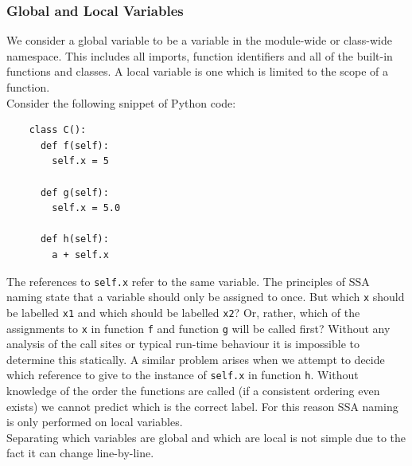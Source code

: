 \documentclass[12pt, titlepage]{article}
\begin{document}
\subsubsection{Global and Local Variables}
\label{chap:ssaGlobals}
We consider a global variable to be a variable in the module-wide or class-wide namespace. This includes all imports, function identifiers and all of the built-in functions and classes. A local variable is one which is limited to the scope of a function. \\
\indent Consider the following snippet of Python code:
\begin{lstlisting}
    class C():
      def f(self):
        self.x = 5
     
      def g(self):
        self.x = 5.0         
        
      def h(self):
        a + self.x 
\end{lstlisting}
The references to \texttt{self.x} refer to the same variable. The principles of SSA naming state that a variable should only be assigned to once. But which \texttt{x} should be labelled \texttt{x1} and which should be labelled \texttt{x2}? Or, rather, which of the assignments to \texttt{x} in function \texttt{f} and function \texttt{g} will be called first? Without any analysis of the call sites or typical run-time behaviour it is impossible to determine this statically. A similar problem arises when we attempt to decide which reference to give to the instance of \texttt{self.x} in function \texttt{h}. Without knowledge of the order the functions are called (if a consistent ordering even exists) we cannot predict which is the correct label. For this reason SSA naming is only performed on local variables. \\
\indent Separating which variables are global and which are local is not simple due to the fact it can change line-by-line.
\end{document}
